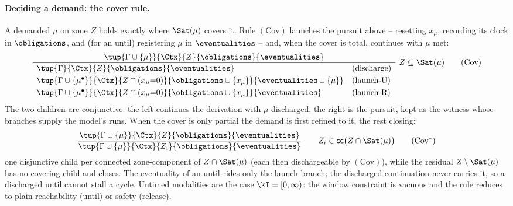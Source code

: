 






\paragraph{Deciding a demand: the cover rule.}
A demanded $\mu$ on zone $Z$ holds exactly where $\Sat(\mu)$ covers it. Rule $(\mathrm{Cov})$ {launches} the pursuit above -- resetting $x_\mu$, recording its clock in $\obligations$, and (for an until) registering $\mu$ in $\eventualities$ -- and, when the cover is total, continues with $\mu$ met:
\[
\frac{\tup{\Gamma\cup\{\mu\}}{\Ctx}{Z}{\obligations}{\eventualities}}
{\begin{array}{ll}
\tup{\Gamma}{\Ctx}{Z}{\obligations}{\eventualities} & (\text{discharge})\\[3pt]
\tup{\Gamma\cup\{\mu^\bullet\}}{\Ctx}{Z\cap(x_\mu{=}0)}{\obligations\cup\{x_\mu\}}{\eventualities\cup\{\mu\}} & (\text{launch-U})\\[3pt]
\tup{\Gamma\cup\{\mu^\bullet\}}{\Ctx}{Z\cap(x_\mu{=}0)}{\obligations\cup\{x_\mu\}}{\eventualities} & (\text{launch-R})
\end{array}}
\ Z\subseteq\Sat(\mu)
\tag{\textrm{Cov}}\label{tag:chk}
\]
The two children are conjunctive: the left continues the derivation with $\mu$ discharged, the right {is} the pursuit, kept as the witness whose branches supply the model's runs. When the cover is only partial the demand is first refined to it, the rest closing:
\[
\frac{\tup{\Gamma\cup\{\mu\}}{\Ctx}{Z}{\obligations}{\eventualities}}
{\tup{\Gamma\cup\{\mu\}}{\Ctx}{Z_i}{\obligations}{\eventualities}}
\qquad Z_i\in\mathsf{cc}\big(Z\cap\Sat(\mu)\big)
\tag{\textrm{Cov}$^{*}$}\label{tag:chkstar}
\]
one disjunctive child per connected zone-component of $Z\cap\Sat(\mu)$ (each then dischargeable by $(\mathrm{Cov})$), while the residual $Z\setminus\Sat(\mu)$ has no covering child and closes. The eventuality of an until rides only the launch branch; the discharged continuation never carries it, so a discharged until cannot stall a cycle. Untimed modalities are the case $\kI=[0,\infty)$: the window constraint is vacuous and the rule reduces to plain reachability (until) or safety (release).